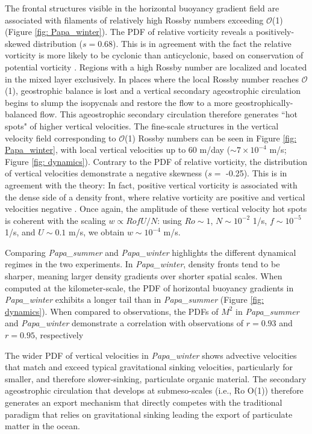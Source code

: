 \documentclass[draft,linenumbers]{agujournal2018}
\begin{document}
The frontal structures visible in the horizontal buoyancy gradient field are associated with filaments of relatively high Rossby numbers exceeding $\mathcal{O}$(1) (Figure \ref{fig: Papa_winter}). The PDF of relative vorticity reveals a positively-skewed distribution ($s = 0.68$). This is in agreement with the fact the relative vorticity is more likely to be cyclonic than anticyclonic, based on conservation of potential vorticity \citep{Hoskins_1972}. Regions with a high Rossby number are localized and located in the mixed layer exclusively. In places where the local Rossby number reaches $\mathcal{O}$(1), geostrophic balance is lost and a vertical secondary ageostrophic circulation begins to slump the isopycnals and restore the flow to a more geostrophically-balanced flow. This ageostrophic secondary circulation therefore generates ``hot spots" of higher vertical velocities. The fine-scale structures in the vertical velocity field corresponding to $\mathcal{O}$(1) Rossby numbers  can be seen in Figure \ref{fig: Papa_winter}, with local vertical velocities up to 60 m/day ($\sim 7\times10^{-4}$ m/s; Figure \ref{fig: dynamics}). Contrary to the PDF of relative vorticity, the distribution of vertical velocities demonstrate a negative skewness ($s =$ -0.25). This is in agreement with the theory: In fact, positive vertical vorticity is associated with the dense side of a density front, where relative vorticity are positive and vertical velocities negative \citep{Mahadevan_2016}. Once again, the amplitude of these vertical velocity hot spots is coherent with the scaling $w \propto RofU/N$: using $Ro\sim1$, $N\sim10^{-2}$ 1/s, $f\sim10^{-5}$ 1/s, and $U\sim0.1$ m/s, we obtain $w\sim 10^{-4}$ m/s. %

Comparing \textit{Papa\_summer} and \textit{Papa\_winter} highlights the different dynamical regimes in the two experiments. In \textit{Papa\_winter}, density fronts tend to be sharper, meaning larger density gradients over shorter spatial scales. When computed at the kilometer-scale, the PDF of horizontal buoyancy gradients in \textit{Papa\_winter} exhibits a longer tail than in \textit{Papa\_summer} (Figure \ref{fig: dynamics}). When compared to observations, the PDFs of $M^2$ in \textit{Papa\_summer} and \textit{Papa\_winter} demonstrate a correlation with observations of $r = 0.93$ and $r = 0.95$, respectively


The wider PDF of vertical velocities in \textit{Papa\_winter} shows advective velocities that match and exceed typical gravitational sinking velocities, particularly for smaller, and therefore slower-sinking, particulate organic material. The secondary ageostrophic circulation that develops at submeso-scales (i.e., Ro O(1)) therefore generates an export mechanism that directly competes with the traditional paradigm that relies on gravitational sinking leading the export of particulate matter in the ocean.
\end{document}
